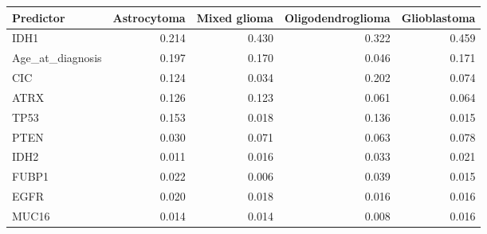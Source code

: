 \begin{tabular}{lrrrr}
\toprule
\textbf{Predictor} & \textbf{Astrocytoma} & \textbf{Mixed glioma} & \textbf{Oligodendroglioma} & \textbf{Glioblastoma} \\
\midrule
IDH1 & 0.214 & 0.430 & 0.322 & 0.459 \\
Age\_at\_diagnosis & 0.197 & 0.170 & 0.046 & 0.171 \\
CIC & 0.124 & 0.034 & 0.202 & 0.074 \\
ATRX & 0.126 & 0.123 & 0.061 & 0.064 \\
TP53 & 0.153 & 0.018 & 0.136 & 0.015 \\
PTEN & 0.030 & 0.071 & 0.063 & 0.078 \\
IDH2 & 0.011 & 0.016 & 0.033 & 0.021 \\
FUBP1 & 0.022 & 0.006 & 0.039 & 0.015 \\
EGFR & 0.020 & 0.018 & 0.016 & 0.016 \\
MUC16 & 0.014 & 0.014 & 0.008 & 0.016 \\
\bottomrule
\end{tabular}
